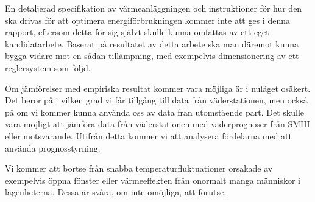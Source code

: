 En detaljerad specifikation av värmeanläggningen och instruktioner för hur den ska drivas för att optimera energiförbrukningen kommer inte att ges i denna rapport, eftersom detta för sig självt skulle kunna omfattas av ett eget kandidatarbete. Baserat på resultatet av detta arbete ska man däremot kunna bygga vidare mot en sådan tillämpning, med exempelvis dimensionering av ett reglersystem som följd.

Om jämförelser med empiriska resultat kommer vara möjliga är i nuläget osäkert. Det beror på i vilken grad vi får tillgång till data från väderstationen, men också på om vi kommer kunna använda oss av data från utomstående part. Det skulle vara möjligt att jämföra data från väderstationen med väderprognoser från SMHI eller motsvarande. Utifrån detta kommer vi att analysera fördelarna med att använda prognosstyrning.

Vi kommer att bortse från snabba temperaturfluktuationer orsakade av exempelvis öppna fönster eller värmeeffekten från onormalt många människor i lägenheterna. Dessa är svåra, om inte omöjliga, att förutse.